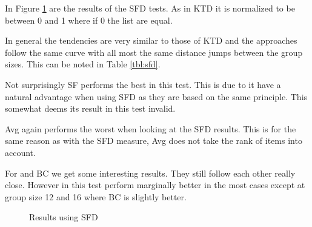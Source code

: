 In Figure \ref{fig:footruledistance} are the results of the SFD tests. As in KTD it is normalized to be between 0 and 1 where if 0 the list are equal.

In general the tendencies are very similar to those of KTD and the approaches follow the same curve with all most the same distance jumps between the group sizes. This can be noted in Table \ref{tbl:sfd}.

Not surprisingly SF performs the best in this test. This is due to it have a natural advantage when using SFD as they are based on the same principle. This somewhat deems its result in this test invalid.

Avg again performs the worst when looking at the SFD results. This is for the same reason as with the SFD measure, Avg does not take the rank of items into account.

For \MC and BC we get some interesting results. They still follow each other really close. However in this test \MC perform marginally better in the most cases except at group size 12 and 16 where BC is slightly better.

\begin{figure}[H]
\caption{Results using SFD} \label{fig:footruledistance}
\end{figure}

